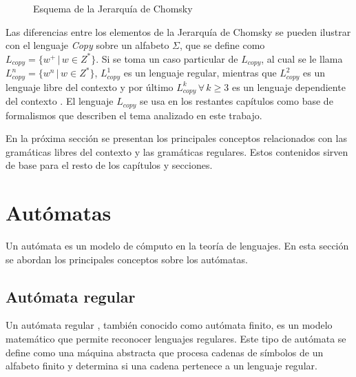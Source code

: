 \documentclass[12pt]{article}
\begin{document}
\begin{figure}
      \centering
      \caption{Esquema de la Jerarquía de Chomsky}
      \label{fig:ChomskySchema} %
\end{figure}

Las diferencias entre los elementos de la Jerarquía de Chomsky se pueden ilustrar con el lenguaje 
\textit{Copy} sobre un alfabeto $\Sigma$, que se define como $L_{copy}=\{w^+\,|\,w\in Z^*\}$.
Si se toma un caso particular de $L_{copy}$, al cual se le llama $L_{copy}^n=\{w^n\,|\,w\in Z^*\}$,
$L_{copy}^1$ es un lenguaje regular, mientras que $L_{copy}^2$ es un lenguaje libre del contexto y por último
$L_{copy}^k\,\forall\,k\geq 3$ es un lenguaje dependiente del contexto \cite{authomataTheory}. El lenguaje 
$L_{copy}$ se usa en los restantes capítulos como base de formalismos que describen el tema analizado en este trabajo.

En la próxima sección se presentan los principales conceptos relacionados con las gramáticas libres del contexto y las 
gramáticas regulares. Estos contenidos sirven de base para el resto de los capítulos y secciones.
\section{Autómatas}
Un autómata es un modelo de cómputo en la teoría de lenguajes. En esta sección se abordan los principales conceptos sobre los autómatas.
\subsection{Autómata regular}

Un autómata regular \cite{authomataTheory}, también conocido como autómata finito, es un modelo matemático 
que permite reconocer lenguajes regulares. Este tipo de autómata se define como una máquina abstracta que 
procesa cadenas de símbolos de un alfabeto finito y determina si una cadena pertenece a un lenguaje regular.
\end{document}
